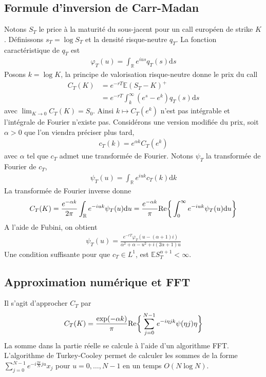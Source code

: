 \documentclass{article}
\begin{document}
\subsection{Formule d'inversion de Carr-Madan}
Notons $S_T$ le price à la maturité du sous-jacent pour un call européen de strike $K$. Définissons $s_T = \log S_T$ et la densité risque-neutre $q_T$. La fonction caractéristique de $q_T$ est
%
\begin{align*}
	\varphi_T(u) = \int_{\mathbb{R}}e^{ius}q_T(s)\mathrm{d}s
\end{align*}
%
Posons $k = \log K$, la principe de valorisation risque-neutre donne le prix du call
%
\begin{align*}
	C_T(K) &= e^{-rT}\mathbb{E}(S_T-K)^+\\
	&= e^{-rT}\int_{k}^{\infty}(e^s-e^k)q_T(s)\mathrm{d}s
\end{align*}
%
avec $\lim_{K\to 0} C_T(K)= S_0$. Ainsi $k \mapsto C_T(e^k)$ n'est pas intégrable et l'intégrale de Fourier n'existe pas. Considérons une version modifiée du prix, soit $\alpha >0$ que l'on viendra préciser plus tard,
%
\begin{align*}
	c_T(k) = e^{\alpha k}C_T(e^k)
\end{align*}
%
avec $\alpha$ tel que $c_T$ admet une transformée de Fourier. Notons $\psi_T$ la transformée de Fourier de $c_T$,
%
\begin{align*}
	\psi_T(u) = \int_{\mathbb{R}}e^{iuk}c_T(k)\mathrm{d}k
\end{align*}
%
La transformée de Fourier inverse donne
%
\begin{align*}
	C_T(K) = \frac{e^{-\alpha k}}{2\pi}\int_{\mathbb{R}}e^{-i u k} \psi_T(u)\mathrm{d}u = \frac{e^{-\alpha k}}{\pi}\textup{Re}\bigg\{\int_{0}^{\infty}e^{-i u k}\psi_T(u)\mathrm{d}u\bigg\}
\end{align*}
%
A l'aide de Fubini, on obtient
%
\begin{align*}
\psi_T(u) = \frac{e^{-rT}\varphi_T(u-(\alpha+1)i)}{\alpha^2+\alpha-u^2+i(2\alpha+1)u}
\end{align*}
%
Une condition suffisante pour que $c_T \in L^1$, est $\mathbb{E}S_T^{\alpha+1} < \infty$.
\subsection{Approximation numérique et FFT}
Il s'agit d'approcher $C_T$ par 
%
\begin{align*}
	C_T(K) = \frac{\exp(-\alpha k)}{\pi}\textup{Re}\bigg\{\sum_{j=0}^{N-1} e^{-i \eta j k}\psi(\eta j)\eta\bigg\}
\end{align*}
%
La somme dans la partie réelle se calcule à l'aide d'un algorithme FFT. L'algorithme de Turkey-Cooley permet de calculer les sommes de la forme $\sum_{j=0}^{N-1} e^{-i\frac{2\pi}{N} j u} x_j$ pour $u=0,\ldots, N-1$ en un temps $O(N\log N)$.
\end{document}
